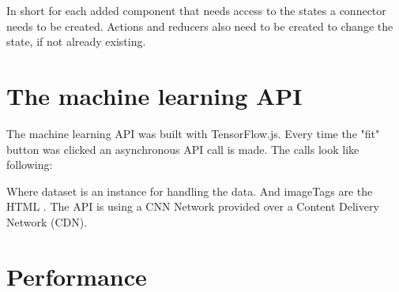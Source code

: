 In short for each added component that needs access to the states a connector needs to be created. Actions and reducers also need to be created to change the state, if not already existing.



\section{The machine learning API}
The machine learning API was built with TensorFlow.js. Every time the "fit" button was clicked an asynchronous API call is made. The calls look like following:



Where dataset is an instance for handling the data. And imageTags are the HTML . The API is using a CNN Network provided over a Content Delivery Network (CDN).

\section{Performance}








